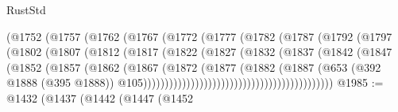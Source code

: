 \begin{lexlean}{RustStd}
\begin{coremodule}
{\begin{coremodule}
{{{{{{{{{{{{                                  (@1752
                                    (@1757
                                      (@1762
                                        (@1767
                                          (@1772
                                            (@1777
                                              (@1782
                                                (@1787
                                                  (@1792
                                                    (@1797
                                                      (@1802
                                                        (@1807
                                                          (@1812
                                                            (@1817
                                                              (@1822
                                                                (@1827
                                                                  (@1832
                                                                    (@1837
                                                                      (@1842
                                                                        (@1847
                                                                          (@1852
                                                                            (@1857
                                                                              (@1862
                                                                                (@1867
                                                                                  (@1872
                                                                                    (@1877
                                                                                      (@1882
                                                                                        (@1887
                                                                                          (@653
                                                                                            (@392
                                                                                              @1888
                                                                                              (@395
                                                                                                @1888))
                                                                                            @105))))))))))))))))))))))))))))))))))))))))))))
@1985 := @1432
    (@1437
      (@1442
        (@1447
          (@1452
}}}}}}}}}}}}
\end{coremodule}}
\end{coremodule}
\end{lexlean}
